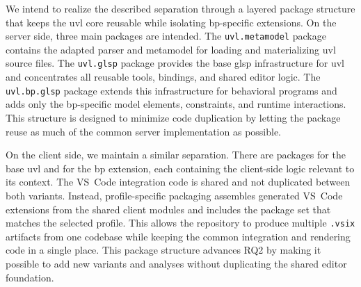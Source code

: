 We intend to realize the described separation through a layered package structure that keeps the \gls{uvl} core reusable while isolating \gls{bp}-specific extensions.
On the server side, three main packages are intended.
The \texttt{uvl.metamodel} package contains the adapted parser and metamodel for loading and materializing \gls{uvl} source files.
The \texttt{uvl.glsp} package provides the base \gls{glsp} infrastructure for \gls{uvl} and concentrates all reusable tools, bindings, and shared editor logic.
The \texttt{uvl.bp.glsp} package extends this infrastructure for behavioral programs and adds only the \gls{bp}-specific model elements, constraints, and runtime interactions.
This structure is designed to minimize code duplication by letting the package reuse as much of the common server implementation as possible.

On the client side, we maintain a similar separation.
There are packages for the base \gls{uvl} and for the \gls{bp} extension, each containing the client-side logic relevant to its context.
The VS~Code integration code is shared and not duplicated between both variants.
Instead, profile-specific packaging assembles generated VS~Code extensions from the shared client modules and includes the package set that matches the selected profile.
This allows the repository to produce multiple \texttt{.vsix} artifacts from one codebase while keeping the common integration and rendering code in a single place.
This package structure advances RQ2 by making it possible to add new variants and analyses without duplicating the shared editor foundation.